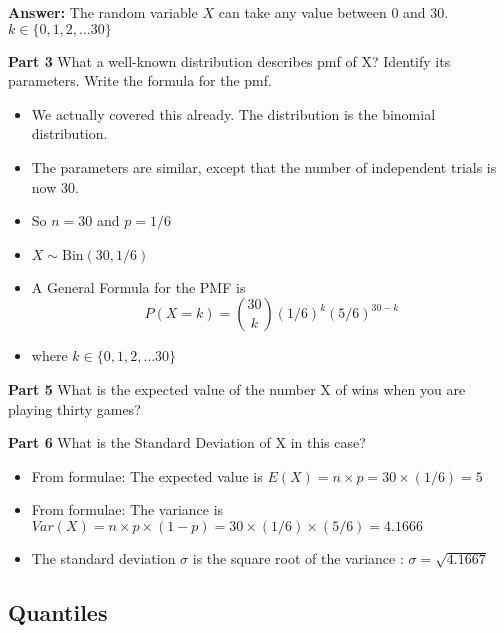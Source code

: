 \bigskip

\noindent \textbf{Answer: }The random variable $X$ can take any value between 0 and 30.  $k \in \{0,1,2,\ldots 30\}$



\noindent\textbf{Part 3} What a well-known distribution describes pmf of X? Identify its parameters. Write the formula
for the pmf.

\begin{itemize}
\item We actually covered this already. The distribution is the binomial distribution.
\item The parameters are similar, except that the number of independent trials is now 30.
\item So $n=30$  and $p = 1/6$
\item $X \sim \mbox{Bin}(30,1/6)$
\item A General Formula for the PMF is
\[P(X=k) =  { 30 \choose k} (1/6)^k (5/6)^{30-k}   \]
\item where $k \in \{0,1,2,\ldots 30 \}$
\end{itemize}








\noindent\textbf{Part 5} What is the expected value of the number X of wins when you are playing thirty games?\\

\bigskip

\noindent\textbf{Part 6} What is the Standard Deviation of X in this case?

\bigskip

\begin{itemize}
\item From formulae: The expected value is $E(X) = n\times p = 30 \times (1/6) = 5$
\item From formulae: The variance is $Var(X) = n\times p\times (1-p) = 30 \times (1/6) \times (5/6) = 4.1666$
\item The standard deviation $\sigma$ is the square root of the variance : $\sigma = \sqrt{4.1667}$
\end{itemize}




\subsection{Quantiles}

